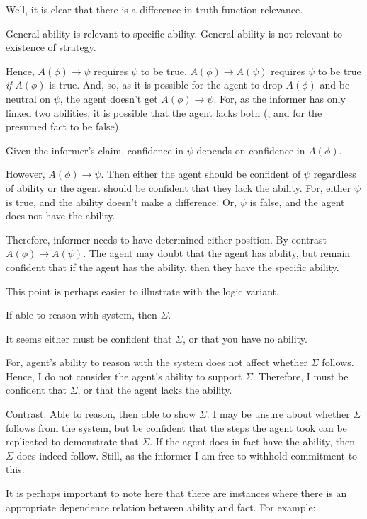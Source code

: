 \documentclass[10pt]{article}
\newcommand{\hozlinedash}[0]{%
  \noindent\hdashrule[0.5ex][c]{\textwidth}{.1pt}{2.5pt}
}
\begin{document}
\hozlinedash

Well, it is clear that there is a difference in truth function relevance.

General ability is relevant to specific ability.
General ability is not relevant to existence of strategy.

Hence, \(A(\phi) \rightarrow \psi\) requires \(\psi\) to be true.
\(A(\phi) \rightarrow A(\psi)\) requires \(\psi\) to be true \emph{if} \(A(\phi)\) is true.
And, so, as it is possible for the agent to drop \(A(\phi)\) and be neutral on \(\psi\), the agent doesn't get \(A(\phi) \rightarrow \psi\).
For, as the informer has only linked two abilities, it is possible that the agent lacks both (, and for the presumed fact to be false).

Given the informer's claim, confidence in \(\psi\) depends on confidence in \(A(\phi)\).

However, \(A(\phi) \rightarrow \psi\).
Then either the agent should be confident of \(\psi\) regardless of ability or the agent should be confident that they lack the ability.
For, either \(\psi\) is true, and the ability doesn't make a difference.
Or, \(\psi\) is false, and the agent does not have the ability.

Therefore, informer needs to have determined either position.
By contrast \(A(\phi) \rightarrow A(\psi)\).
The agent may doubt that the agent has ability, but remain confident that if the agent has the ability, then they have the specific ability.

This point is perhaps easier to illustrate with the logic variant.

If able to reason with system, then \(\Sigma\).

It seems either must be confident that \(\Sigma\), or that you have no ability.

For, agent's ability to reason with the system does not affect whether \(\Sigma\) follows.
Hence, I do not consider the agent's ability to support \(\Sigma\).
Therefore, I must be confident that \(\Sigma\), or that the agent lacks the ability.

Contrast.
Able to reason, then able to show \(\Sigma\).
I may be unsure about whether \(\Sigma\) follows from the system, but be confident that the steps the agent took can be replicated to demonstrate that \(\Sigma\).
If the agent does in fact have the ability, then \(\Sigma\) does indeed follow.
Still, as the informer I am free to withhold commitment to this.

It is perhaps important to note here that there are instances where there is an appropriate dependence relation between ability and fact.
For example:
\end{document}
